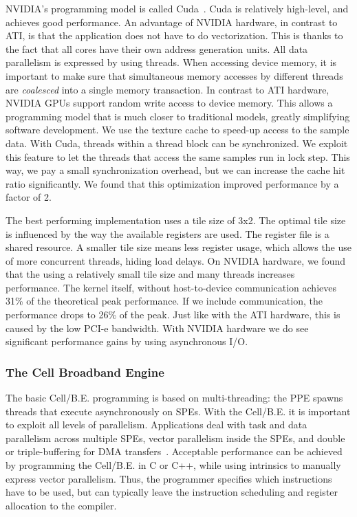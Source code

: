 \documentclass{article}
\newcommand{\longversion}[1]{}
\begin{document}
NVIDIA's programming model is called Cuda~\cite{cuda-manual}.
Cuda is relatively high-level, and achieves good performance.
An advantage of NVIDIA hardware, in contrast to ATI, is that the application does not have to do 
vectorization. This is thanks to the fact that all cores have their own address generation units. 
All data parallelism is expressed by using threads.
When
accessing device memory, it is important to make sure that
simultaneous memory accesses by different threads are \emph{coalesced}
into a single memory transaction.  In contrast to ATI hardware, NVIDIA
GPUs support random write access to device memory. This allows a
programming model that is much closer to traditional models, greatly
simplifying software development.
We use the
texture cache to speed-up access to the sample data. 
With Cuda, threads
within a thread block can be synchronized.  We exploit this feature to let
the threads that access the same samples run in lock step.  This way,
we pay a small synchronization overhead, but we can increase the cache hit
ratio significantly.  We found that this optimization improved performance by a factor of 2.

\longversion{
We also investigated the use of the per-multiprocessor shared memory as an
application-managed cache.  Others report good results with this
approach~\cite{gpu-cache}.  However, we found that, for our
application, the use of shared memory only led to performance
degradation.
}

The best performing
implementation uses a tile size of 3x2.
The optimal tile size is influenced by the way the available registers are used.
The register file is a shared resource. A smaller tile size means less register usage, 
which allows the use of more concurrent threads, hiding load delays.
On NVIDIA hardware, we found that the using a relatively small tile size and many threads increases performance.
The kernel itself, without host-to-device communication achieves 31\%
of the theoretical peak performance.  If we include communication, the
performance drops to 26\% of the peak. Just like with the ATI
hardware, this is caused by the low PCI-e bandwidth.  With NVIDIA
hardware we do see significant performance gains by using asynchronous I/O.


\subsubsection{The Cell Broadband Engine}

The basic \mbox{Cell/B.E.} programming is based on multi-threading:
the PPE spawns threads that execute asynchronously on SPEs.  With the
\mbox{Cell/B.E.} it is important to exploit all levels of parallelism.
Applications deal with task and data parallelism across multiple SPEs,
vector parallelism inside the SPEs, and double or triple-buffering for
DMA transfers~\cite{cell}.  Acceptable performance can be achieved by
programming the \mbox{Cell/B.E.}  in C or C++, while using intrinsics
to manually express vector parallelism.  Thus, the programmer
specifies which instructions have to be used, but can typically leave
the instruction scheduling and register allocation to the compiler.
\end{document}
